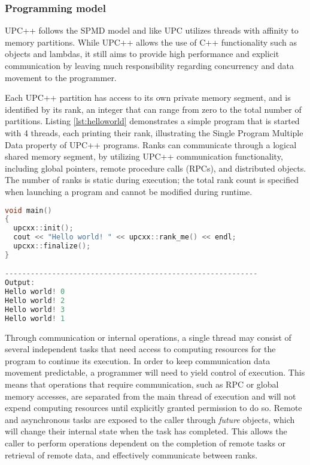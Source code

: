 \documentclass{uit-report}
\begin{document}
\subsubsection{Programming model}
UPC++ follows the SPMD model and like UPC utilizes threads with affinity to memory partitions. While UPC++ allows the use of C++ functionality such as objects and lambdas, it still aims to provide high performance and explicit communication by leaving much responsibility regarding concurrency and data movement to the programmer.

Each UPC++ partition has access to its own private memory segment, and is identified by its rank, an integer that can range from zero to the total number of partitions. Listing \ref{lst:helloworld} demonstrates a simple program that is started with 4 threads, each printing their rank, illustrating the Single Program Multiple Data property of UPC++ programs. Ranks can communicate through a logical shared memory segment, by utilizing UPC++ communication functionality, including global pointers, remote procedure calls (RPCs), and distributed objects. The number of ranks is static during execution; the total rank count is specified when launching a program and cannot be modified during runtime.


\begin{lstlisting}[label={lst:helloworld}, float, caption="Hello World"-program in UPC++ and its output, frame=tlrb, captionpos=b, language=c++, showstringspaces=false]
void main()
{
  upcxx::init();
  cout << "Hello world! " << upcxx::rank_me() << endl;
  upcxx::finalize();
}

-----------------------------------------------------------
Output:
Hello world! 0
Hello world! 2
Hello world! 3
Hello world! 1
\end{lstlisting}



Through communication or internal operations, a single thread may consist of several independent tasks that need access to computing resources for the program to continue its execution. In order to keep communication data movement predictable, a programmer will need to yield control of execution. This means that operations that require communication, such as RPC or global memory accesses, are separated from the main thread of execution and will not expend computing resources until explicitly granted permission to do so. Remote and asynchronous tasks are exposed to the caller through \emph{future} objects, which will change their internal state when the task has completed. This allows the caller to perform operations dependent on the completion of remote tasks or retrieval of remote data, and effectively communicate between ranks.
\end{document}
